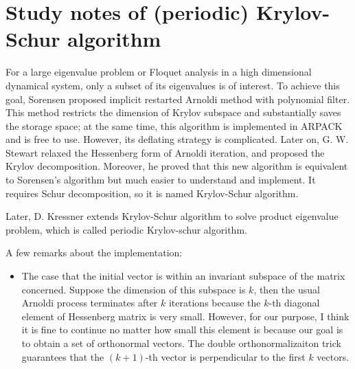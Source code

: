 \section{Study notes of (periodic) Krylov-Schur algorithm}
\label{sect:KrylovSchur}

For a large eigenvalue problem or Floquet analysis in a high dimensional dynamical system,
only a subset of its eigenvalues is of interest. To achieve this goal, Sorensen 
\etc{} proposed
implicit restarted Arnoldi method with polynomial filter. This method restricts the dimension
of Krylov subspace and substantially saves the storage space; at the same time, 
this algorithm is implemented in ARPACK and is free to use. 
However, its deflating strategy is complicated. Later on,
G. W. Stewart relaxed the Hessenberg form of Arnoldi iteration, and proposed the 
Krylov decomposition. Moreover, he proved that this new algorithm is equivalent to
Sorensen's algorithm but much easier to understand and implement. It requires
Schur decomposition, so it is named Krylov-Schur algorithm.

Later, D. Kressner 
extends Krylov-Schur algorithm to solve product eigenvalue 
problem, which
is called periodic Krylov-schur algorithm.  

A few remarks about the implementation:
\begin{itemize}
\item The case that the initial vector is within an invariant subspace of the 
  matrix concerned. Suppose the dimension of this subspace is $k$, then the 
  usual Arnoldi process terminates after $k$ iterations because the $k$-th
  diagonal element of Hessenberg matrix is very small. However, for our 
  purpose, I think it is fine to continue no matter how small this element 
  is because our goal is to obtain a set of orthonormal vectors. The double
  orthonormalizaiton trick guarantees that the $(k+1)$-th vector is perpendicular
  to the first $k$ vectors.
\end{itemize}
